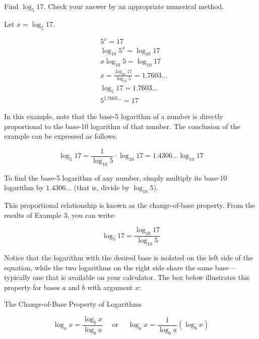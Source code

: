 \begin{example} Find $\log _5 17$. Check your answer by an appropriate numerical method.

\begin{solution} Let $x=\log _5 17$.

\begin{equation*}
\begin{aligned}
& 5^x=17 \\
& \log _{10} 5^x=\log _{10} 17 \\
& x \log _{10} 5=\log _{10} 17 \\
& x=\frac{\log _{10} 17}{\log _{10} 5}=1.7603 \ldots \\
& \log _5 17=1.7603 \ldots \\
& 5^{1.7603 \ldots}=17
\end{aligned}
\end{equation*}
\end{solution}
\end{example}

In this example, note that the base-5 logarithm of a number is directly proportional to the base-10 logarithm of that number. The conclusion of the example can be expressed as follows:

\[
\log_5 17 = \frac{1}{\log_{10} 5} \cdot \log_{10} 17 = 1.4306 \ldots \log_{10} 17
\]

To find the base-5 logarithm of any number, simply multiply its base-10 logarithm by \(1.4306 \ldots\) (that is, divide by \(\log_{10} 5\)).

This proportional relationship is known as the change-of-base property. From the results of Example 3, you can write:

\[
\log_5 17 = \frac{\log_{10} 17}{\log_{10} 5}
\]

Notice that the logarithm with the desired base is isolated on the left side of the equation, while the two logarithms on the right side share the same base—typically one that is available on your calculator. The box below illustrates this property for bases \(a\) and \(b\) with argument \(x\):

\begin{custombox}{The Change-of-Base Property of Logarithms}

\begin{equation*}
\log _a x=\frac{\log_b x}{\log_b a} \quad \text { or } \quad \log_a x=\frac{1}{\log_b a}\left(\log_b x\right)
\end{equation*}
    
\end{custombox}

